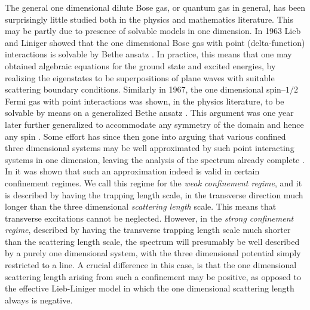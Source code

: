 The general one dimensional dilute Bose gas, or quantum gas in general, has been surprisingly little studied both in the physics and mathematics literature. This may be partly due to presence of solvable models in one dimension. In 1963 Lieb and Liniger showed that the one dimensional Bose gas with point (delta-function) interactions is solvable by Bethe ansatz \cite{lieb1963exact}. In practice, this means that one may obtained algebraic equations for the ground state and excited energies, by realizing the eigenstates to be superpositions of plane waves with suitable scattering boundary conditions. Similarly in 1967, the one dimensional spin--$ 1/2 $ Fermi gas with point interactions was shown, in the physics literature, to be solvable by means on a generalized Bethe ansatz \cite{yang1967some}. This argument was one year later further generalized to accommodate any symmetry of the domain and hence any spin \cite{sutherland1968further}. Some effort has since then gone into arguing that various confined three dimensional systems may be well approximated by such point interacting systems in one dimension, leaving the analysis of the spectrum already complete \cite{olshanii1998atomic,petrov2000regimes,dunjko2001bosons,lieb2003one,lieb2004one,seiringer2008lieb}. In \cite{lieb2003one,lieb2004one,seiringer2008lieb} it was shown that such an approximation indeed is valid in certain confinement regimes. We call this regime for the \emph{weak confinement regime}, and it is described by having the trapping length scale, in the transverse direction much longer than the three dimensional \emph{scattering length} scale. This means that transverse excitations cannot be neglected. However, in the \emph{strong confinement regime}, described by having the transverse trapping length scale much shorter than the scattering length scale, the spectrum will presumably be well described by a purely one dimensional system, with the three dimensional potential simply restricted to a line. A crucial difference in this case, is that the one dimensional scattering length arising from such a confinement may be positive, as opposed to the effective Lieb-Liniger model in which the one dimensional scattering length always is negative.\\
